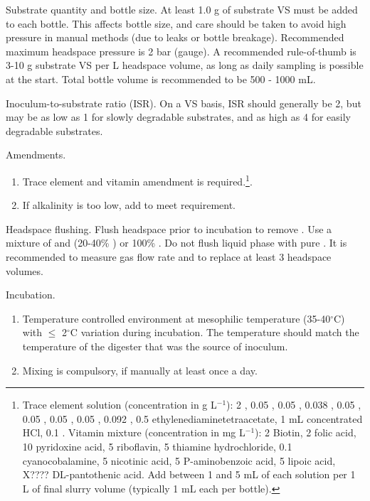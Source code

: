   \item Substrate quantity and bottle size. 
    At least 1.0 g of substrate VS must be added to each bottle. 
    This affects bottle size, and care should be taken to avoid high pressure in manual methods (due to leaks or bottle breakage). 
    Recommended maximum headspace pressure is 2 bar (gauge). 
    A recommended rule-of-thumb is 3-10 g substrate VS per L headspace volume, as long as daily sampling is possible at the start. 
    Total bottle volume is recommended to be 500 - 1000 mL.
  \item Inoculum-to-substrate ratio (ISR). On a VS basis, ISR should generally be 2, but may be as low as 1 for slowly degradable substrates, and as high as 4 for easily degradable substrates.
  \item Amendments. 
    \begin{enumerate}
      \item Trace element and vitamin amendment is required.\footnote{
          Trace element solution (concentration in g L$^{-1}$): 2 , 0.05 , 0.05 , 0.038 , 0.05 , 
          0.05 , 0.05 , 0.05 , 0.092 , 0.5 ethylenediaminetetraacetate, 1 mL concentrated HCl, 
          0.1 .
          \newline
          Vitamin mixture (concentration in mg L$^{-1}$): 2 Biotin, 2 folic acid, 10 pyridoxine acid, 5 riboflavin, 5 thiamine hydrochloride, 0.1 cyanocobalamine, 
          5 nicotinic acid, 5 P-aminobenzoic acid, 5 lipoic acid, X???? DL-pantothenic acid.
          \newline
          Add between 1 and 5 mL of each solution per 1 L of final slurry volume (typically 1 mL each per bottle).
        }.
      \item If alkalinity is too low, add  to meet requirement.
    \end{enumerate}
  \item Headspace flushing. Flush headspace prior to incubation to remove . 
    Use a mixture of  and  (20-40\% ) or 100\% . Do not flush liquid phase with pure . 
    It is recommended to measure gas flow rate and to replace at least 3 headspace volumes.
  \item Incubation.
    \begin{enumerate}
      \item Temperature controlled environment at mesophilic temperature (35-40$^\circ$C) with $\le$ 2$^\circ$C variation during incubation. 
        The temperature should match the temperature of the digester that was the source of inoculum.
      \item Mixing is compulsory, if manually at least once a day.
    \end{enumerate}

